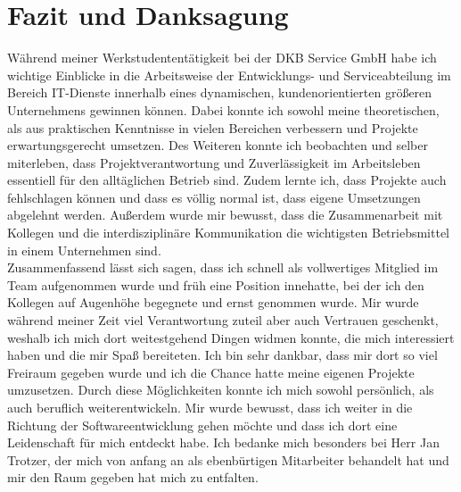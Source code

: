 
\section{Fazit und Danksagung}
\label{sec:Fazit und Danksagung}

Während meiner Werkstudententätigkeit bei der DKB Service GmbH habe ich wichtige Einblicke in die Arbeitsweise der Entwicklungs- und Serviceabteilung im Bereich IT-Dienste innerhalb eines dynamischen, kundenorientierten größeren Unternehmens gewinnen können. Dabei konnte ich sowohl meine theoretischen, als aus praktischen Kenntnisse in vielen Bereichen verbessern und Projekte erwartungsgerecht umsetzen. Des Weiteren konnte ich beobachten und selber miterleben, dass Projektverantwortung und Zuverlässigkeit im Arbeitsleben essentiell für den alltäglichen Betrieb sind. Zudem lernte ich, dass Projekte auch fehlschlagen können und dass es völlig normal ist, dass eigene Umsetzungen abgelehnt werden. Außerdem wurde mir bewusst, dass die Zusammenarbeit mit Kollegen und die interdisziplinäre Kommunikation die wichtigsten Betriebsmittel in einem Unternehmen sind. 
\\
Zusammenfassend lässt sich sagen, dass ich schnell als vollwertiges Mitglied im Team aufgenommen wurde und früh eine Position innehatte, bei der ich den Kollegen auf Augenhöhe begegnete und ernst genommen wurde. Mir wurde während meiner Zeit viel Verantwortung zuteil aber auch Vertrauen geschenkt, weshalb ich mich dort weitestgehend Dingen widmen konnte, die mich interessiert haben und die mir Spaß bereiteten. Ich bin sehr dankbar, dass mir dort so viel Freiraum gegeben wurde und ich die Chance hatte meine eigenen Projekte umzusetzen. Durch diese Möglichkeiten konnte ich mich sowohl persönlich, als auch beruflich weiterentwickeln. Mir wurde bewusst, dass ich weiter in die Richtung der Softwareentwicklung gehen möchte und dass ich dort eine Leidenschaft für mich entdeckt habe. Ich bedanke mich besonders bei Herr Jan Trotzer, der mich von anfang an als ebenbürtigen Mitarbeiter behandelt hat und mir den Raum gegeben hat mich zu entfalten. 